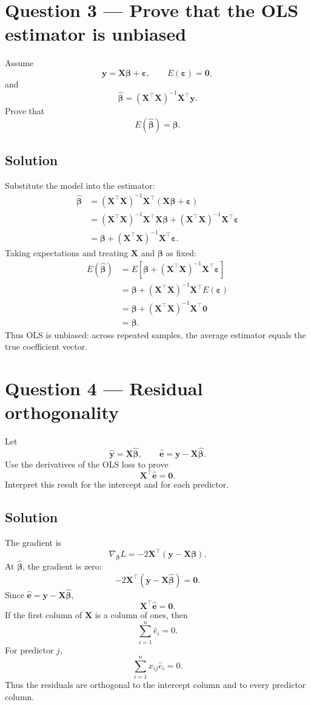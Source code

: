 ﻿\documentclass[11pt]{article}
\newcommand{\yvec}{\mathbf y}
\newcommand{\bvec}{\boldsymbol\beta}
\newcommand{\evec}{\boldsymbol\varepsilon}
\newcommand{\xmat}{\mathbf X}
\begin{document}
\newpage
\section*{Question 3 --- Prove that the OLS estimator is unbiased}
Assume
\[
\yvec=\xmat\bvec+\evec,
\qquad E(\evec)=\mathbf0,
\]
and
\[
\widehat{\bvec}=(\xmat^\top\xmat)^{-1}\xmat^\top\yvec.
\]
Prove that
\[
E(\widehat{\bvec})=\bvec.
\]

\subsection*{Solution}
Substitute the model into the estimator:
\begin{align*}
\widehat{\bvec}
&=(\xmat^\top\xmat)^{-1}\xmat^\top
(\xmat\bvec+\evec)\\
&=(\xmat^\top\xmat)^{-1}\xmat^\top\xmat\bvec
+(\xmat^\top\xmat)^{-1}\xmat^\top\evec\\
&=\bvec+(\xmat^\top\xmat)^{-1}\xmat^\top\evec.
\end{align*}
Taking expectations and treating $\xmat$ and $\bvec$ as fixed:
\begin{align*}
E(\widehat{\bvec})
&=E\left[\bvec+(\xmat^\top\xmat)^{-1}\xmat^\top\evec\right]\\
&=\bvec+(\xmat^\top\xmat)^{-1}\xmat^\top E(\evec)\\
&=\bvec+(\xmat^\top\xmat)^{-1}\xmat^\top\mathbf0\\
&=\boxed{\bvec}.
\end{align*}
Thus OLS is unbiased: across repeated samples, the average estimator equals the true coefficient vector.

\section*{Question 4 --- Residual orthogonality}
Let
\[
\widehat{\yvec}=\xmat\widehat{\bvec},
\qquad
\widehat{\mathbf e}=\yvec-\xmat\widehat{\bvec}.
\]
Use the derivatives of the OLS loss to prove
\[
\boxed{\xmat^\top\widehat{\mathbf e}=\mathbf0}.
\]
Interpret this result for the intercept and for each predictor.

\subsection*{Solution}
The gradient is
\[
\nabla_{\bvec}L=-2\xmat^\top(\yvec-\xmat\bvec).
\]
At $\widehat{\bvec}$, the gradient is zero:
\[
-2\xmat^\top(\yvec-\xmat\widehat{\bvec})=\mathbf0.
\]
Since $\widehat{\mathbf e}=\yvec-\xmat\widehat{\bvec}$,
\[
\boxed{\xmat^\top\widehat{\mathbf e}=\mathbf0}.
\]
If the first column of $\xmat$ is a column of ones, then
\[
\sum_{i=1}^n\widehat e_i=0.
\]
For predictor $j$,
\[
\sum_{i=1}^n x_{ij}\widehat e_i=0.
\]
Thus the residuals are orthogonal to the intercept column and to every predictor column.
\end{document}
